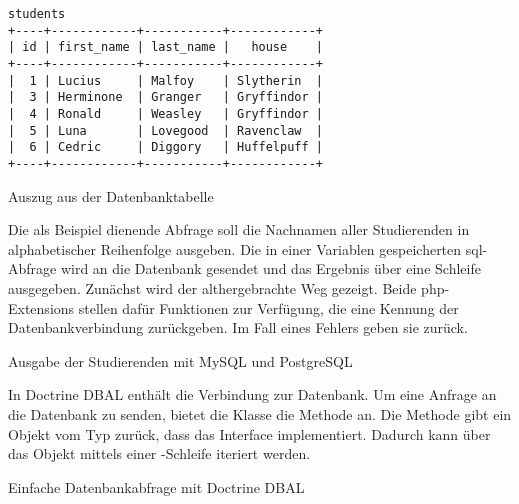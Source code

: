\begin{table}[H]
\begin{Verbatim}[samepage=true]
students
+----+------------+-----------+------------+
| id | first_name | last_name |   house    |
+----+------------+-----------+------------+
|  1 | Lucius     | Malfoy    | Slytherin  |
|  3 | Herminone  | Granger   | Gryffindor |
|  4 | Ronald     | Weasley   | Gryffindor |
|  5 | Luna       | Lovegood  | Ravenclaw  |
|  6 | Cedric     | Diggory   | Huffelpuff |
+----+------------+-----------+------------+
\end{Verbatim}
\caption{Auszug aus der Datenbanktabelle}
\label{tab:students}
\end{table}

\newpage

Die als Beispiel dienende Abfrage soll die Nachnamen aller Studierenden in alphabetischer Reihenfolge ausgeben. Die in einer Variablen gespeicherten \gls{sql}-Abfrage wird an die Datenbank gesendet und das Ergebnis über eine Schleife ausgegeben. Zunächst wird der althergebrachte Weg gezeigt. Beide \gls{php}-Extensions stellen dafür  Funktionen zur Verfügung, die eine Kennung der Datenbankverbindung zurückgeben. Im Fall eines Fehlers geben sie  zurück.

\begin{listing}[H]
\caption{Ausgabe der Studierenden mit MySQL und PostgreSQL}
\label{lst:externalFetchAssocMethods}
\end{listing}

In Doctrine DBAL enthält  die Verbindung zur Datenbank. Um eine Anfrage an die Datenbank zu senden, bietet die Klasse die Methode  an. Die Methode gibt ein Objekt vom Typ  zurück, dass das  Interface implementiert. Dadurch kann über das Objekt mittels einer -Schleife iteriert werden.

\begin{listing}[H]
\caption{Einfache Datenbankabfrage mit Doctrine DBAL}
\label{lst:dbalSimpleQuery}
\end{listing}

